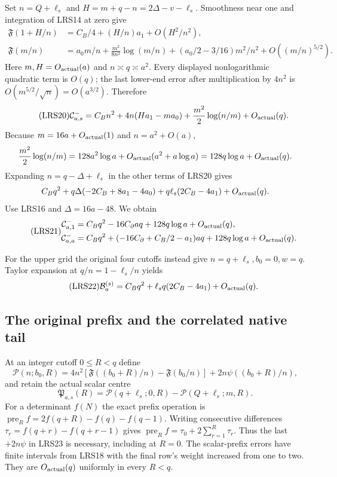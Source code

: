 \documentclass[11pt,a4paper]{article}
\begin{document}
Set $n=Q+\ell_s$ and $H=m+q-n=2\Delta-v-\ell_s$.
Smoothness near one and integration of LRS14 at zero give
\[
\begin{split}
 \mathfrak F(1+H/n)&=C_B/4+(H/n)a_1+O(H^2/n^2),\\
 \mathfrak F(m/n)&=a_0m/n+\frac{m^2}{8n^2}\log(m/n)
                  +(a_0/2-3/16)m^2/n^2+O((m/n)^{5/2}).
\end{split}
\]
Here $m,H=O_{\rm actual}(a)$ and $n\asymp q\asymp a^2$.
Every displayed nonlogarithmic quadratic term is $O(q)$; the
last lower-end error after multiplication by $4n^2$ is
$O(m^{5/2}/\sqrt n)=O(a^{3/2})$.  Therefore
\begin{equation}\tag{LRS20}
 \mathcal C^-_{a,s}=C_Bn^2+4n(Ha_1-ma_0)
                    +\frac{m^2}{2}\log(n/m)+O_{\rm actual}(q).
\end{equation}
Because $m=16a+O_{\rm actual}(1)$ and $n=a^2+O(a)$,
\[
 \frac{m^2}{2}\log(n/m)
 =128a^2\log a+O_{\rm actual}(a^2+a\log a)
 =128q\log a+O_{\rm actual}(q).
\]
Expanding $n=q-\Delta+\ell_s$ in the other terms of LRS20 gives
\[
 C_Bq^2+q\Delta(-2C_B+8a_1-4a_0)
            +q\ell_s(2C_B-4a_1)+O_{\rm actual}(q).
\]
Use LRS16 and $\Delta=16a-48$.  We obtain
\begin{equation}\tag{LRS21}
\begin{split}
 \mathcal C^-_{a,1}
 &=C_Bq^2-16C_\partial aq+128q\log a+O_{\rm actual}(q),\\
 \mathcal C^-_{a,a}
 &=C_Bq^2+(-16C_\partial+C_B/2-a_1)aq
                +128q\log a+O_{\rm actual}(q).
\end{split}
\end{equation}

For the upper grid the original four cutoffs instead give
$n=q+\ell_s,b_0=0,w=q$.  Taylor expansion at
$q/n=1-\ell_s/n$ yields
\begin{equation}\tag{LRS22}
 \mathcal B_a^{(s)}=C_Bq^2+\ell_sq(2C_B-4a_1)
                         +O_{\rm actual}(q).
\end{equation}

\subsection{The original prefix and the correlated native tail}

At an integer cutoff $0\le R<q$ define
\[
 \mathscr P(n;b_0,R)=4n^2[
  \mathfrak F((b_0+R)/n)-\mathfrak F(b_0/n)]
       +2n\psi((b_0+R)/n),
\]
and retain the actual scalar centre
\begin{equation}\tag{LRS23}
 \mathfrak P_{a,s}(R)=\mathscr P(q+\ell_s;0,R)
                    -\mathscr P(Q+\ell_s;m,R).
\end{equation}
For a determinant $f(N)$ the exact prefix operation is
$\operatorname{pre}_Rf=2f(q+R)-f(q)-f(q-1)$.
Writing consecutive differences $\tau_r=f(q+r)-f(q+r-1)$ gives
$\operatorname{pre}_Rf=\tau_0+2\sum_{r=1}^R\tau_r$.
Thus the last $+2n\psi$ in LRS23 is necessary, including at $R=0$.
The scalar-prefix errors have finite intervals from LRS18 with
the final row's weight increased from one to two.  They are
$O_{\rm actual}(q)$ uniformly in every $R<q$.
\end{document}
